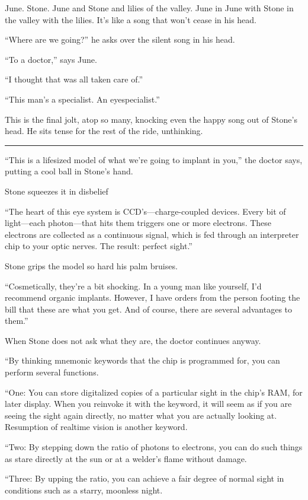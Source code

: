 June. Stone. June and Stone and lilies of the valley. June in June with Stone in the valley with the lilies. It's like a song that won't cease in his head.

``Where are we going?'' he asks over the silent song in his head.

``To a doctor,'' says June.

``I thought that was all taken care of.''

``This man's a specialist. An eyespecialist.''

This is the final jolt, atop so many, knocking even the happy song out of Stone's head. He sits tense for the rest of the ride, unthinking.

\fancybreak{* * *}

``This is a lifesized model of what we're going to implant in you,'' the doctor says, putting a cool ball in Stone's hand.

Stone squeezes it in disbelief

``The heart of this eye system is CCD's---charge-coupled devices. Every bit of light---each photon---that hits them triggers one or more electrons. These electrons are collected as a continuous signal, which is fed through an interpreter chip to your optic nerves. The result: perfect sight.''

Stone grips the model so hard his palm bruises.

``Cosmetically, they're a bit shocking. In a young man like yourself, I'd recommend organic implants. However, I have orders from the person footing the bill that these are what you get. And of course, there are several advantages to them.''

When Stone does not ask what they are, the doctor continues anyway.

``By thinking mnemonic keywords that the chip is programmed for, you can perform several functions.

``One: You can store digitalized copies of a particular sight in the chip's RAM, for later display. When you reinvoke it with the keyword, it will seem as if you are seeing the sight again directly, no matter what you are actually looking at. Resumption of realtime vision is another keyword.

``Two: By stepping down the ratio of photons to electrons, you can do such things as stare directly at the sun or at a welder's flame without damage.

``Three: By upping the ratio, you can achieve a fair degree of normal sight in conditions such as a starry, moonless night.

